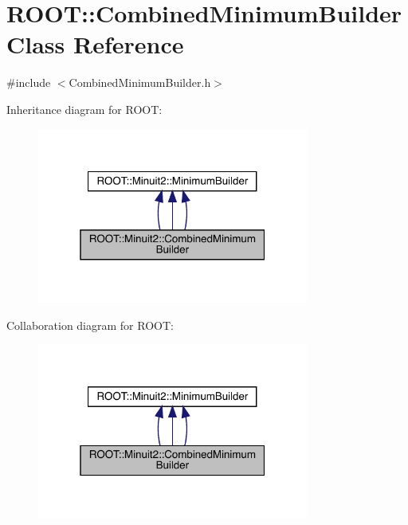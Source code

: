 \hypertarget{classROOT_1_1Minuit2_1_1CombinedMinimumBuilder}{}\section{R\+O\+OT\+:\+:Combined\+Minimum\+Builder Class Reference}
\label{classROOT_1_1Minuit2_1_1CombinedMinimumBuilder}


{\ttfamily \#include $<$Combined\+Minimum\+Builder.\+h$>$}



Inheritance diagram for R\+O\+OT\+:
\nopagebreak
\begin{figure}[H]
\begin{center}
\leavevmode
\includegraphics[width=253pt]{db/d8f/classROOT_1_1Minuit2_1_1CombinedMinimumBuilder__inherit__graph}
\end{center}
\end{figure}


Collaboration diagram for R\+O\+OT\+:
\nopagebreak
\begin{figure}[H]
\begin{center}
\leavevmode
\includegraphics[width=253pt]{d5/d5f/classROOT_1_1Minuit2_1_1CombinedMinimumBuilder__coll__graph}
\end{center}
\end{figure}
